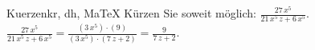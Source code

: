 \begin{MAufgabe}{Kuerzen}{kr, dh, MaTeX}
K\"urzen Sie soweit m\"oglich: $\frac{27\, x^5}{21\, x^5\, z + 6\, x^5}$.\\ 
\ifLsg\MLoesung
\quad $\frac{27\, x^5}{21\, x^5\, z + 6\, x^5}=\frac{(3\, x^5)\cdot(9)}{(3\, x^5)\cdot(7\, z + 2)}=\frac{9}{7\, z + 2}$.\else\relax\fi
 \end{MAufgabe}